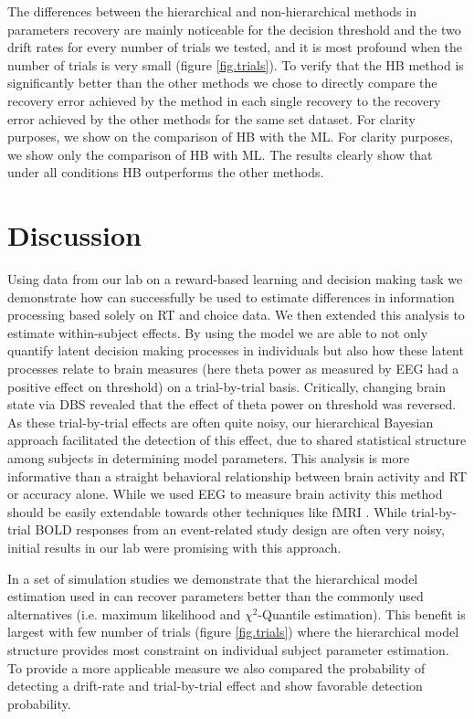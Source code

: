 \documentclass[letterpaper,10pt,english]{article}
\begin{document}
The differences between the hierarchical and non-hierarchical methods
in parameters recovery are mainly noticeable for the decision
threshold and the two drift rates for every number of trials we
tested, and it is most profound when the number of trials is very
small (figure \ref{fig.trials}). To verify that the HB method is
significantly better than the other methods we chose to directly
compare the recovery error achieved by the method in each single
recovery to the recovery error achieved by the other methods for the
same set dataset. For clarity purposes, we show on the comparison of
HB with the ML. For clarity purposes, we show only the comparison of
HB with ML. The results clearly show that under all conditions HB
outperforms the other methods.

\section*{Discussion}
Using data from our lab on a reward-based learning and decision making
task \citep{CavanaghWieckiCohenEtAl11} we demonstrate how 
can successfully be used to estimate differences in information
processing based solely on RT and choice data. We then extended this
analysis to estimate within-subject effects. By using the
 model we are able to not only quantify latent
decision making processes in individuals but also how these latent
processes relate to brain measures (here theta power as measured by
EEG had a positive effect on threshold) on a trial-by-trial basis.
Critically, changing brain state via DBS revealed that the effect of
theta power on threshold was reversed. As these trial-by-trial effects
are often quite noisy, our hierarchical Bayesian approach facilitated
the detection of this effect, due to shared statistical structure
among subjects in determining model parameters. This analysis is more
informative than a straight behavioral relationship between brain
activity and RT or accuracy alone. While we used EEG to measure brain
activity this method should be easily extendable towards other
techniques like fMRI \citep[e.g.][]{ManenBrownEicheleEtAl11}. While
trial-by-trial BOLD responses from an event-related study design are
often very noisy, initial results in our lab were promising with this
approach.

In a set of simulation studies we demonstrate that the hierarchical
model estimation used in  can recover parameters better
than the commonly used alternatives (i.e. maximum likelihood and
$\chi^2$-Quantile estimation). This benefit is largest with few number
of trials (figure \ref{fig.trials}) where the hierarchical model
structure provides most constraint on individual subject parameter
estimation. To provide a more applicable measure we also compared the
probability of detecting a drift-rate and trial-by-trial effect and
show favorable detection probability.
\end{document}
